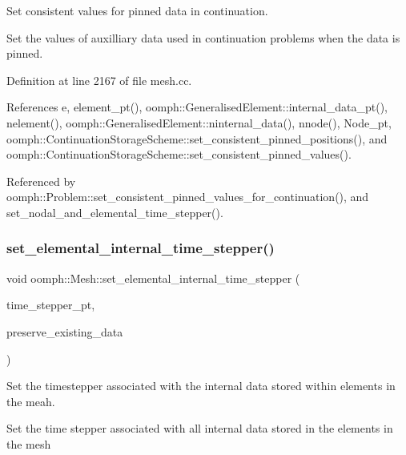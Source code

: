 Set consistent values for pinned data in continuation. 

Set the values of auxilliary data used in continuation problems when the data is pinned. 

Definition at line 2167 of file mesh.\+cc.



References e, element\+\_\+pt(), oomph\+::\+Generalised\+Element\+::internal\+\_\+data\+\_\+pt(), nelement(), oomph\+::\+Generalised\+Element\+::ninternal\+\_\+data(), nnode(), Node\+\_\+pt, oomph\+::\+Continuation\+Storage\+Scheme\+::set\+\_\+consistent\+\_\+pinned\+\_\+positions(), and oomph\+::\+Continuation\+Storage\+Scheme\+::set\+\_\+consistent\+\_\+pinned\+\_\+values().



Referenced by oomph\+::\+Problem\+::set\+\_\+consistent\+\_\+pinned\+\_\+values\+\_\+for\+\_\+continuation(), and set\+\_\+nodal\+\_\+and\+\_\+elemental\+\_\+time\+\_\+stepper().

\mbox{\label{classoomph_1_1Mesh_a681b7531f2c90ea88c8a5ff4df7bce59}} 
\subsubsection{\texorpdfstring{set\+\_\+elemental\+\_\+internal\+\_\+time\+\_\+stepper()}{set\_elemental\_internal\_time\_stepper()}}
{\footnotesize\ttfamily void oomph\+::\+Mesh\+::set\+\_\+elemental\+\_\+internal\+\_\+time\+\_\+stepper (\begin{DoxyParamCaption}\item[{\hyperlink{classoomph_1_1TimeStepper}{Time\+Stepper} $\ast$const \&}]{time\+\_\+stepper\+\_\+pt,  }\item[{const bool \&}]{preserve\+\_\+existing\+\_\+data }\end{DoxyParamCaption})}



Set the timestepper associated with the internal data stored within elements in the meah. 

Set the time stepper associated with all internal data stored in the elements in the mesh 

